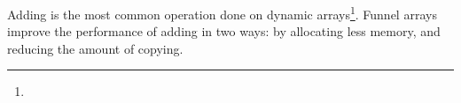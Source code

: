 \descriptn

Adding is the most common operation done on dynamic arrays\footnote{}. Funnel arrays improve the performance of adding in two ways: by allocating less memory, and reducing the amount of copying.
